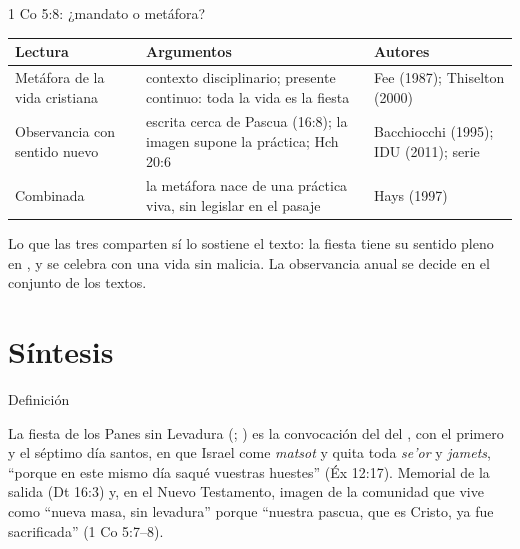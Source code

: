 \begin{frame}{1 Co 5:8: ¿mandato o metáfora?}
\scriptsize\renewcommand{\arraystretch}{1.15}
\begin{tabular}{@{}L{2.6cm}L{6.0cm}L{3.4cm}@{}}
\toprule
\textbf{Lectura} & \textbf{Argumentos} & \textbf{Autores} \\ \midrule
Metáfora de la vida cristiana & contexto disciplinario; presente continuo: toda la vida es la fiesta & Fee (1987); Thiselton (2000) \\
Observancia con sentido nuevo & escrita cerca de Pascua (16:8); la imagen supone la práctica; Hch 20:6 & Bacchiocchi (1995); IDU (2011); serie \\
Combinada & la metáfora nace de una práctica viva, sin legislar en el pasaje & Hays (1997) \\
\bottomrule
\end{tabular}\par\medskip
\small Lo que las tres comparten sí lo sostiene el texto: la fiesta tiene su sentido pleno en , y se celebra con una vida sin malicia. La observancia anual se decide en el conjunto de los textos.
\end{frame}


\section{Síntesis}

\begin{frame}{Definición}
\begin{tcolorbox}[colback=papiro,colframe=tierraroja,boxrule=1pt,arc=3pt]
\small La fiesta de los Panes sin Levadura (; ) es la convocación del \SENOR{} del , con el primero y el séptimo día santos, en que Israel come \emph{matsot} y quita toda \emph{se'or} y \emph{jamets}, ``porque en este mismo día saqué vuestras huestes'' (Éx 12:17). Memorial de la salida (Dt 16:3) y, en el Nuevo Testamento, imagen de la comunidad que vive como ``nueva masa, sin levadura'' porque ``nuestra pascua, que es Cristo, ya fue sacrificada'' (1 Co 5:7--8).
\end{tcolorbox}
\end{frame}

